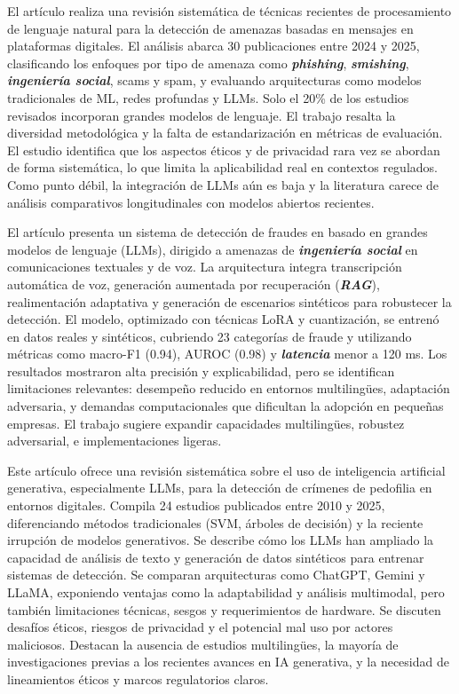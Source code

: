 \cite{Bilz2023}

El artículo realiza una revisión sistemática de técnicas recientes de procesamiento de lenguaje natural para la detección de amenazas basadas en mensajes en plataformas digitales. El análisis abarca 30 publicaciones entre 2024 y 2025, clasificando los enfoques por tipo de amenaza como \textbf{\textit{phishing}}, \textbf{\textit{smishing}}, \textbf{\textit{ingeniería social}}, scams y spam, y evaluando arquitecturas como modelos tradicionales de ML, redes profundas y LLMs. Solo el 20\% de los estudios revisados incorporan grandes modelos de lenguaje. El trabajo resalta la diversidad metodológica y la falta de estandarización en métricas de evaluación. El estudio identifica que los aspectos éticos y de privacidad rara vez se abordan de forma sistemática, lo que limita la aplicabilidad real en contextos regulados. Como punto débil, la integración de LLMs aún es baja y la literatura carece de análisis comparativos longitudinales con modelos abiertos recientes.

\cite{Saias2025}

El artículo presenta un sistema de detección de fraudes en basado en grandes modelos de lenguaje (LLMs), dirigido a amenazas de \textbf{\textit{ingeniería social}} en comunicaciones textuales y de voz. La arquitectura integra transcripción automática de voz, generación aumentada por recuperación (\textbf{\textit{RAG}}), realimentación adaptativa y generación de escenarios sintéticos para robustecer la detección. El modelo, optimizado con técnicas LoRA y cuantización, se entrenó en datos reales y sintéticos, cubriendo 23 categorías de fraude y utilizando métricas como macro-F1 (0.94), AUROC (0.98) y \textbf{\textit{latencia}} menor a 120 ms. Los resultados mostraron alta precisión y explicabilidad, pero se identifican limitaciones relevantes: desempeño reducido en entornos multilingües, adaptación adversaria, y demandas computacionales que dificultan la adopción en pequeñas empresas. El trabajo sugiere expandir capacidades multilingües, robustez adversarial, e implementaciones ligeras.

\cite{otuburun2025realtime}

Este artículo ofrece una revisión sistemática sobre el uso de inteligencia artificial generativa, especialmente LLMs, para la detección de crímenes de pedofilia en entornos digitales. Compila 24 estudios publicados entre 2010 y 2025, diferenciando métodos tradicionales (SVM, árboles de decisión) y la reciente irrupción de modelos generativos. Se describe cómo los LLMs han ampliado la capacidad de análisis de texto y generación de datos sintéticos para entrenar sistemas de detección. Se comparan arquitecturas como ChatGPT, Gemini y LLaMA, exponiendo ventajas como la adaptabilidad y análisis multimodal, pero también limitaciones técnicas, sesgos y requerimientos de hardware. Se discuten desafíos éticos, riesgos de privacidad y el potencial mal uso por actores maliciosos. Destacan la ausencia de estudios multilingües, la mayoría de investigaciones previas a los recientes avances en IA generativa, y la necesidad de lineamientos éticos y marcos regulatorios claros.

\cite{Silva2025}